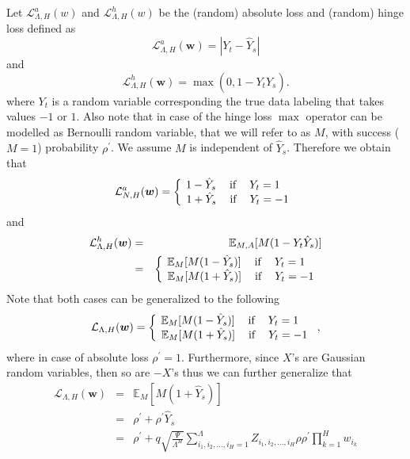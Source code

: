 \documentclass[twoside]{article}
\begin{document}
Let $\mathcal{L}^a_{\Lambda,H}(w)$ and $\mathcal{L}^h_{\Lambda,H}(w)$ be the (random) absolute loss and (random) hinge loss defined as
\[\mathcal{L}^a_{\Lambda,H}({\bm w}) = |Y_t - \hat{Y}_s|
\]
and
\[\mathcal{L}^h_{\Lambda,H}({\bm w}) = \max(0,1-Y_t\hat{Y}_s).
\]
where $Y_t$ is a random variable corresponding the true data labeling that takes values $-1$ or $1$. Also note that in case of the hinge loss $\max$ operator can be modelled as Bernoulli random variable, that we will refer to as $M$, with success ($M = 1$) probability $\rho^{'}$. We assume $M$ is independent of $\hat{Y}_s$. Therefore we obtain that
\[\mathcal{L}^a_{N,H}({\bm w}) = \left \{
  \begin{tabular}{c}
  $\!\!\!\!\!\!1 - \hat{Y}_s$ $\:\:\:\:$if$\:\:\:\:$ $Y_t = 1$ \\
  $\!1 + \hat{Y}_s$ $\:\:\:\:$if$\:\:\:\:$ $Y_t = -1$ \\
  \end{tabular}
\right.
\]
and
\begin{eqnarray*}
\mathcal{L}^h_{\Lambda,H}({\bm w}) &=& \mathbb{E}_{M,A}[M(1-Y_t\hat{Y}_s)]\\&=& \left \{
  \begin{tabular}{c}
  $\!\!\!\!\!\!\mathbb{E}_{M}[M(1 - \hat{Y}_s)]$ $\:\:\:\:$if$\:\:\:\:$ $Y_t = 1$ \\
  $\!\mathbb{E}_{M}[M(1 + \hat{Y}_s)]$ $\:\:\:\:$if$\:\:\:\:$ $Y_t = -1$ \\
  \end{tabular}
\right.
\end{eqnarray*}
Note that both cases can be generalized to the following
\[\mathcal{L}_{\Lambda,H}({\bm w}) = \left \{
  \begin{tabular}{c}
  $\!\!\!\!\!\!\mathbb{E}_{M}[M(1 - \hat{Y}_s)]$ $\:\:\:\:$if$\:\:\:\:$ $Y_t = 1$ \\
  $\!\mathbb{E}_{M}[M(1 + \hat{Y}_s)]$ $\:\:\:\:$if$\:\:\:\:$ $Y_t = -1$ \\
  \end{tabular}
\right.,
\]
where in case of absolute loss $\rho^{'} = 1$. Furthermore, since $X$'s are Gaussian random variables, then so are $-X$'s thus we can further generalize that
\begin{eqnarray*}
\mathcal{L}_{\Lambda,H}({\bm w}) \!\!\!\!\!&=&\!\!\!\!\! \mathbb{E}_{M}[M(1 + \hat{Y}_s)]\\
&=& \!\!\!\!\!\rho^{'} + \rho^{'}\hat{Y}_s\\
&=& \!\!\!\!\!\rho^{'} + q\sqrt{\!\frac{\Psi}{\Lambda^H}\!}\!\sum_{i_1,i_2,\dots,i_H=1}^{\Lambda}\!Z_{i_1,i_2,\dots,i_H}\rho\rho^{'}\prod_{k = 1}^{H}w_{i_k}
\end{eqnarray*}
\end{document}
